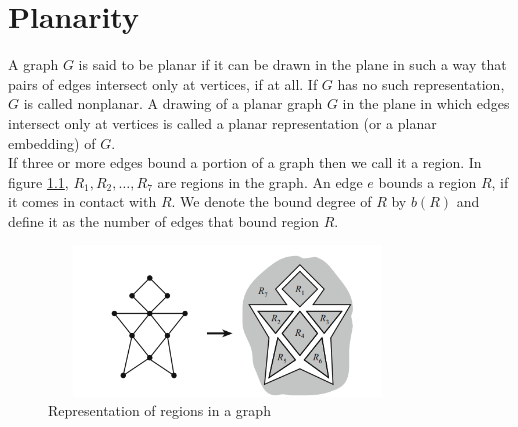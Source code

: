 \documentclass[../basic_graph_theory.tex]{subfiles}
\begin{document}
\chapter{Planarity}
\setcounter{chapter}{6} %
\setcounter{section}{6}
\setcounter{equation}{6}
\setcounter{figure}{6}

A graph $G$ is said to be planar if it can be drawn in the plane in such a way that pairs of edges intersect only at vertices, if at all. If $G$ has no such representation, $G$ is called nonplanar. A drawing of a planar graph $G$ in the plane in which edges intersect only at vertices is called a planar representation (or a planar embedding) of $G$.\\

If three or more edges bound a portion of a graph then we call it a region. In figure \ref{fig:regions}, $R_1, R_2, \dots, R_7$ are regions in the graph. An edge $e$ bounds a region $R$, if it comes in contact with $R$. We denote the bound degree of $R$ by $b(R)$ and define it as the number of edges that bound region $R$.

\begin{figure}[hbt!]
    \label{fig:regions}
    \centering
    \includegraphics[height=4cm,width=9.5cm]{images/region.png}
    \caption{Representation of regions in a graph}
\end{figure}
\end{document}
